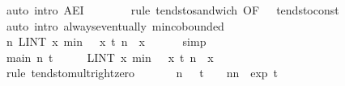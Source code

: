 \documentclass{svjour3}
\begin{document}
{\begin{isabellebody}
\ {\isacharparenleft}auto\ intro{\isacharbang}{\isacharcolon}\ AE{\isacharunderscore}I{}{\isacharparenright}\isanewline
\ \ \ \ \ \ \isamarkupfalse%
\ {\isacharparenleft}rule\ tendsto{\isacharunderscore}sandwich\ {\isacharbrackleft}OF\ {\isacharunderscore}\ {\isacharunderscore}\ tendsto{\isacharunderscore}const\ {\isacharasterisk}{\isacharasterisk}{\isacharasterisk}{\isacharbrackright}{\isacharparenright}\isanewline
\ \ \ \ \ \ \isamarkupfalse%
\ {\isacharparenleft}auto\ intro{\isacharbang}{\isacharcolon}\ always{\isacharunderscore}eventually\ min{\isachardot}cobounded{}{\isacharparenright}\isanewline
\ \ \ \ \ \ \isamarkupfalse%
\isanewline
\ \ \ \ \isamarkupfalse%
\ {\isachardoublequoteopen}{\isacharparenleft}{\isasymlambda}n{\isachardot}\ LINT\ x{\isacharbar}{\isasymmu}{\isachardot}\ min\ {\isacharparenleft}{}\ {\isacharasterisk}\ x\ {\isacharparenleft}{\isasymbar}{\isacharquery}t\ n{\isasymbar}\ {\isacharasterisk}\ {\isasymbar}x{\isasymbar}\ {\isacharcircum}\ {}{\isacharparenright}{\isacharparenright}\ {\isacharminus}{\isacharminus}{\isacharminus}{\isacharminus}{\isachargreater}\ {}{\isachardoublequoteclose}\ \isamarkupfalse%
\ simp\isanewline
\ \ \ \ \isamarkupfalse%
\ main{}{\isacharcolon}\ {\isachardoublequoteopen}{\isacharparenleft}{\isasymlambda}n{\isachardot}\ t\ {\isacharslash}\ {\isacharparenleft}{}\ {\isacharasterisk}\ {\isasymsigma}\ {\isacharasterisk}\ {\isacharparenleft}LINT\ x{\isacharbar}{\isasymmu}{\isachardot}\ min\ {\isacharparenleft}{}\ {\isacharasterisk}\ x\ {\isacharparenleft}{\isasymbar}{\isacharquery}t\ n{\isasymbar}\ {\isacharasterisk}\ {\isasymbar}x{\isasymbar}\ {\isacharcircum}\ {}{\isacharparenright}{\isacharparenright}{\isacharparenright}\ {\isacharminus}{\isacharminus}{\isacharminus}{\isacharminus}{\isachargreater}\ {}{\isachardoublequoteclose}\isanewline
\ \ \ \ \ \ \isamarkupfalse%
\ {\isacharparenleft}rule\ tendsto{\isacharunderscore}mult{\isacharunderscore}right{\isacharunderscore}zero{\isacharparenright}\isanewline
\ \ \ \ \isamarkupfalse%
\ {\isacharasterisk}{\isacharasterisk}{\isacharcolon}\ {\isachardoublequoteopen}{\isacharparenleft}{\isasymlambda}n{\isachardot}\ {\isacharparenleft}{}\ {\isacharplus}\ {\isacharparenleft}{\isacharminus}{\isacharparenleft}t{\isacharcircum}{}{\isacharparenright}\ {\isacharslash}\ {}{\isacharparenright}\ {\isacharslash}\ n{\isacharparenright}{\isacharcircum}n{\isacharparenright}\ {\isacharminus}{\isacharminus}{\isacharminus}{\isacharminus}{\isachargreater}\ exp\ {\isacharparenleft}{\isacharminus}{\isacharparenleft}t{\isacharcircum}{}{\isacharparenright}\ {\isacharslash}\ {}{\isacharparenright}{\isachardoublequoteclose}\isanewline

\end{isabellebody}}
\end{document}
